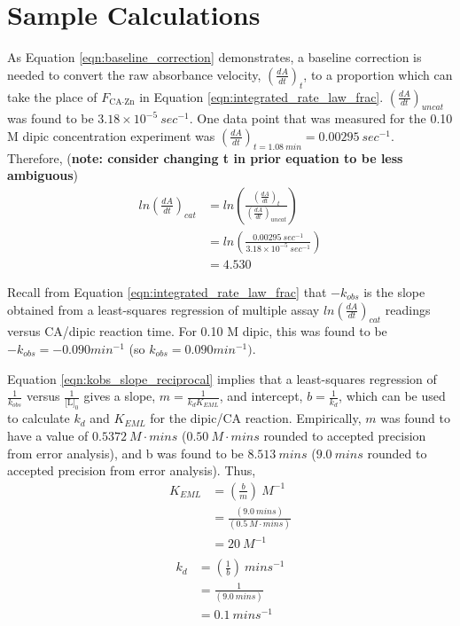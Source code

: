 \section{Sample Calculations}
As Equation \eqref{eqn:baseline_correction} demonstrates, a baseline correction is needed to convert the raw absorbance velocity, $\left(\frac{dA}{dt}\right)_{t}$, to a proportion which can take the place of $F_\text{CA$\cdot$Zn}$ in Equation \eqref{eqn:integrated_rate_law_frac}. $\left(\frac{dA}{dt}\right)_{uncat}$ was found to be $3.18\times10^{-5}\ sec^{-1}$. One data point that was measured for the 0.10 M dipic concentration experiment was $\left(\frac{dA}{dt}\right)_{t=1.08\ min}=0.00295\ sec^{-1}$. Therefore, (\textbf{note: consider changing t in prior equation to be less ambiguous})
\begin{equation*}
\begin{split}
ln \left(\frac{dA}{dt}\right)_{cat}
&= ln \left( \frac{ \left (\frac{dA}{dt}\right)_{t} }{ \left (\frac{dA}{dt}\right)_{uncat} } \right) \\
&= ln \left( \frac{ 0.00295\ sec^{-1} }{ 3.18\times10^{-5}\ sec^{-1} } \right) \\
&= 4.530
\end{split}
\end{equation*}

Recall from Equation \eqref{eqn:integrated_rate_law_frac} that $-k_{obs}$ is the slope obtained from a least-squares regression of multiple assay $ln \left(\frac{dA}{dt}\right)_{cat}$ readings versus CA/dipic reaction time. For 0.10 M dipic, this was found to be $-k_{obs}=-0.090 min^{-1}$ (so $k_{obs}=0.090 min^{-1})$.

Equation \eqref{eqn:kobs_slope_reciprocal} implies that a least-squares regression of $\frac{1}{k_{obs}}$ versus $\frac{1}{\text{[L]}_0}$ gives a slope, $m=\frac{1}{k_{d}K_{EML}}$, and intercept, $b=\frac{1}{k_{d}}$, which can be used to calculate $k_d$ and $K_{EML}$ for the dipic/CA reaction. Empirically, $m$ was found to have a value of $0.5372\ M\cdot{mins}$ ($0.50\ M\cdot{mins}$ rounded to accepted precision from error analysis), and b was found to be $8.513\ mins$ ($9.0\ mins$ rounded to accepted precision from error analysis). Thus,
\begin{equation}\label{eqn:samp_calc_keml}
\begin{split}
K_{EML}&=\left(\frac{b}{m}\right){\ }M^{-1}\\
&=\frac{\left (9.0{\ }mins\right )}{\left (0.5{\ }M\cdot{mins}\right )}\\
&=20\ M^{-1}\\
\end{split}
\end{equation}
\begin{equation}\label{eqn:samp_calc_kd}
\begin{split}
k_{d}&=\left(\frac{1}{b}\right){\ }mins^{-1}\\
&=\frac{1}{\left (9.0{\ }mins\right )}\\
&=0.1\ mins^{-1}\\
\end{split}
\end{equation}